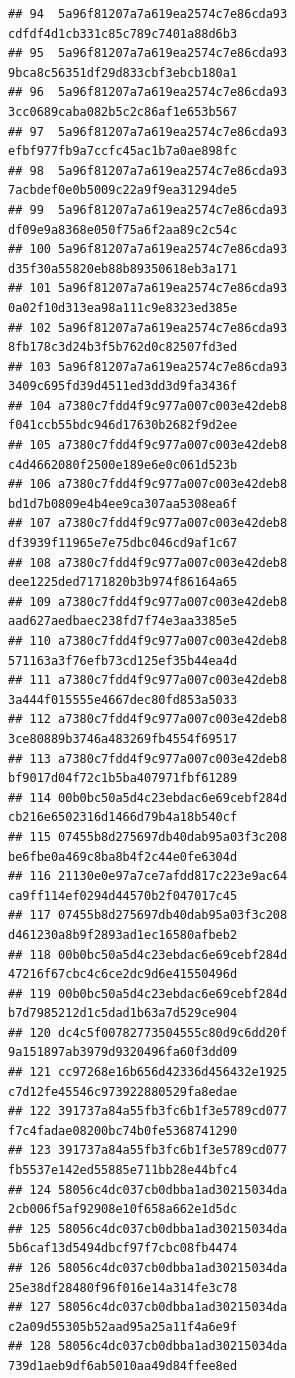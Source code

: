 \documentclass[]{article}
\begin{document}
\begin{verbatim}
## 94  5a96f81207a7a619ea2574c7e86cda93   cdfdf4d1cb331c85c789c7401a88d6b3
## 95  5a96f81207a7a619ea2574c7e86cda93   9bca8c56351df29d833cbf3ebcb180a1
## 96  5a96f81207a7a619ea2574c7e86cda93   3cc0689caba082b5c2c86af1e653b567
## 97  5a96f81207a7a619ea2574c7e86cda93   efbf977fb9a7ccfc45ac1b7a0ae898fc
## 98  5a96f81207a7a619ea2574c7e86cda93   7acbdef0e0b5009c22a9f9ea31294de5
## 99  5a96f81207a7a619ea2574c7e86cda93   df09e9a8368e050f75a6f2aa89c2c54c
## 100 5a96f81207a7a619ea2574c7e86cda93   d35f30a55820eb88b89350618eb3a171
## 101 5a96f81207a7a619ea2574c7e86cda93   0a02f10d313ea98a111c9e8323ed385e
## 102 5a96f81207a7a619ea2574c7e86cda93   8fb178c3d24b3f5b762d0c82507fd3ed
## 103 5a96f81207a7a619ea2574c7e86cda93   3409c695fd39d4511ed3dd3d9fa3436f
## 104 a7380c7fdd4f9c977a007c003e42deb8   f041ccb55bdc946d17630b2682f9d2ee
## 105 a7380c7fdd4f9c977a007c003e42deb8   c4d4662080f2500e189e6e0c061d523b
## 106 a7380c7fdd4f9c977a007c003e42deb8   bd1d7b0809e4b4ee9ca307aa5308ea6f
## 107 a7380c7fdd4f9c977a007c003e42deb8   df3939f11965e7e75dbc046cd9af1c67
## 108 a7380c7fdd4f9c977a007c003e42deb8   dee1225ded7171820b3b974f86164a65
## 109 a7380c7fdd4f9c977a007c003e42deb8   aad627aedbaec238fd7f74e3aa3385e5
## 110 a7380c7fdd4f9c977a007c003e42deb8   571163a3f76efb73cd125ef35b44ea4d
## 111 a7380c7fdd4f9c977a007c003e42deb8   3a444f015555e4667dec80fd853a5033
## 112 a7380c7fdd4f9c977a007c003e42deb8   3ce80889b3746a483269fb4554f69517
## 113 a7380c7fdd4f9c977a007c003e42deb8   bf9017d04f72c1b5ba407971fbf61289
## 114 00b0bc50a5d4c23ebdac6e69cebf284d   cb216e6502316d1466d79b4a18b540cf
## 115 07455b8d275697db40dab95a03f3c208   be6fbe0a469c8ba8b4f2c44e0fe6304d
## 116 21130e0e97a7ce7afdd817c223e9ac64   ca9ff114ef0294d44570b2f047017c45
## 117 07455b8d275697db40dab95a03f3c208   d461230a8b9f2893ad1ec16580afbeb2
## 118 00b0bc50a5d4c23ebdac6e69cebf284d   47216f67cbc4c6ce2dc9d6e41550496d
## 119 00b0bc50a5d4c23ebdac6e69cebf284d   b7d7985212d1c5dad1b63a7d529ce904
## 120 dc4c5f00782773504555c80d9c6dd20f   9a151897ab3979d9320496fa60f3dd09
## 121 cc97268e16b656d42336d456432e1925   c7d12fe45546c973922880529fa8edae
## 122 391737a84a55fb3fc6b1f3e5789cd077   f7c4fadae08200bc74b0fe5368741290
## 123 391737a84a55fb3fc6b1f3e5789cd077   fb5537e142ed55885e711bb28e44bfc4
## 124 58056c4dc037cb0dbba1ad30215034da   2cb006f5af92908e10f658a662e1d5dc
## 125 58056c4dc037cb0dbba1ad30215034da   5b6caf13d5494dbcf97f7cbc08fb4474
## 126 58056c4dc037cb0dbba1ad30215034da   25e38df28480f96f016e14a314fe3c78
## 127 58056c4dc037cb0dbba1ad30215034da   c2a09d55305b52aad95a25a11f4a6e9f
## 128 58056c4dc037cb0dbba1ad30215034da   739d1aeb9df6ab5010aa49d84ffee8ed

\end{verbatim}
\end{document}
